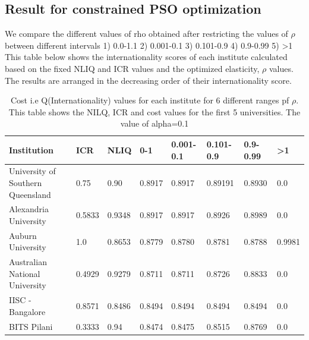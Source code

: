 \documentclass{article}
\begin{document}
\subsection{Result for constrained PSO optimization}
\newpage
We compare the different values of rho obtained after restricting the values of $\rho$ between different intervals 1) 0.0-1.1 2) 0.001-0.1 
3) 0.101-0.9 
4) 0.9-0.99 
5) >1  \\
This table below shows the internationality scores of each institute calculated based on the fixed NLIQ and ICR values and the optimized elasticity, $\rho$ values. The results are arranged in the decreasing order of their internationality score.

\begin{table}[ht!]
    \centering
    \begin{tabular}{ | m{15em} | m{1cm}| m{1cm} |m{1cm}| m{1cm}|m{1cm}| m{1cm}| m{1cm}|} 
\hline
Institution & ICR & NLIQ & 0-1 & 0.001-0.1 & 0.101-0.9 & 0.9-0.99 & >1\\ 
\hline
University of Southern Queensland & 0.75 & 0.90 & 0.8917 &	0.8917 &	0.89191 &	0.8930 & 0.0 \\ 
\hline
Alexandria University & 0.5833&	0.9348 &0.8917 &0.8917 &	0.8926 &	0.8989 &0.0\\
\hline
Auburn University & 1.0	& 0.8653 & 0.8779 &	0.8780 &	0.8781 &	0.8788 &	0.9981\\
\hline 
Australian National University & 0.4929 & 0.9279 & 0.8711 &	0.8711 &	0.8726 &	0.8833 & 0.0\\
\hline
IISC - Bangalore &
 0.8571 &	0.8486 & 0.8494 &	0.8494 &	0.8494 & 0.8494 &	0.0\\
\hline
BITS Pilani & 0.3333 &	0.94  & 0.8474 &	0.8475 &	0.8515 &	0.8769	& 0.0\\
\hline
\end{tabular}

    \caption{Cost i.e Q(Internationality)  values for each institute for 6 different ranges pf $\rho$. This table shows the NILQ, ICR and cost values for the first 5 universities. The value of alpha=0.1}
    \label{tab:al_0.1}
\end{table}
\end{document}
